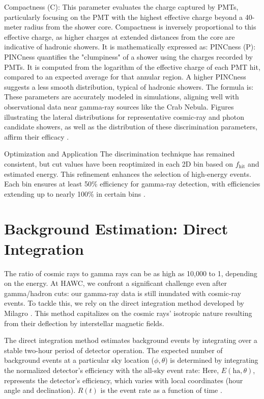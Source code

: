 Compactness (C): This parameter evaluates the charge captured by PMTs, particularly focusing on the PMT with the highest effective charge beyond a 40-meter radius from the shower core.
Compactness is inversely proportional to this effective charge, as higher charges at extended distances from the core are indicative of hadronic showers.
It is mathematically expressed as:
\compactness
PINCness (P): PINCness quantifies the "clumpiness" of a shower using the charges recorded by PMTs.
It is computed from the logarithm of the effective charge of each PMT hit, compared to an expected average for that annular region.
A higher PINCness suggests a less smooth distribution, typical of hadronic showers.
The formula is:
\pincness
These parameters are accurately modeled in simulations, aligning well with observational data near gamma-ray sources like the Crab Nebula.
Figures illustrating the lateral distributions for representative cosmic-ray and photon candidate showers, as well as the distribution of these discrimination parameters, affirm their efficacy \cite{Abeysekara_2017}.

Optimization and Application
The discrimination technique has remained consistent, but cut values have been reoptimized in each 2D bin based on $f_{\text{hit}}$ and estimated energy.
This refinement enhances the selection of high-energy events.
Each bin ensures at least 50\% efficiency for gamma-ray detection, with efficiencies extending up to nearly 100\% in certain bins \cite{Abeysekara_2017,100TEV_Crab_HAWC}.

\section{Background Estimation: Direct Integration}\label{hawc:direc_int}

The ratio of cosmic rays to gamma rays can be as high as 10,000 to 1, depending on the energy.
At HAWC, we confront a significant challenge even after gamma/hadron cuts: our gamma-ray data is still inundated with cosmic-ray events.
To tackle this, we rely on the direct integration method developed by Milagro \cite{Milagro_crab}.
This method capitalizes on the cosmic rays' isotropic nature resulting from their deflection by interstellar magnetic fields.

The direct integration method estimates background events by integrating over a stable two-hour period of detector operation.
The expected number of background events at a particular sky location ($\phi, \theta$) is determined by integrating the normalized detector's efficiency with the all-sky event rate:
\directInt
Here, $E(\text{ha}, \theta)$, represents the detector's efficiency, which varies with local coordinates (hour angle and declination).
$R(t)$ is the event rate as a function of time \cite{Milagro_crab}.

